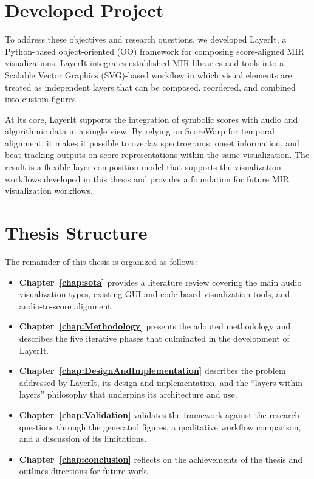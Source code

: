 \section{Developed Project} 
To address these objectives and research questions, we developed LayerIt, a Python-based object-oriented (OO) framework for composing score-aligned MIR visualizations. LayerIt integrates established MIR libraries and tools into a Scalable Vector Graphics (SVG)-based workflow in which visual elements are treated as independent layers that can be composed, reordered, and combined into custom figures.

At its core, LayerIt supports the integration of symbolic scores with audio and algorithmic data in a single view. By relying on ScoreWarp for temporal alignment, it makes it possible to overlay spectrograms, onset information, and beat-tracking outputs on score representations within the same visualization. The result is a flexible layer-composition model that supports the visualization workflows developed in this thesis and provides a foundation for future MIR visualization workflows.

\section{Thesis Structure}

The remainder of this thesis is organized as follows:
\begin{itemize}
    \item \textbf{Chapter~\ref{chap:sota}} provides a literature review covering the main audio visualization types, existing GUI and code-based visualization tools, and audio-to-score alignment.
    \item \textbf{Chapter~\ref{chap:Methodology}} presents the adopted methodology and describes the five iterative phases that culminated in the development of LayerIt.
    \item \textbf{Chapter~\ref{chap:DesignAndImplementation}} describes the problem addressed by LayerIt, its design and implementation, and the ``layers within layers'' philosophy that underpins its architecture and use.
    \item \textbf{Chapter~\ref{chap:Validation}} validates the framework against the research questions through the generated figures, a qualitative workflow comparison, and a discussion of its limitations.
    \item  \textbf{Chapter~\ref{chap:conclusion}} reflects on the achievements of the thesis and outlines directions for future work.
\end{itemize} 